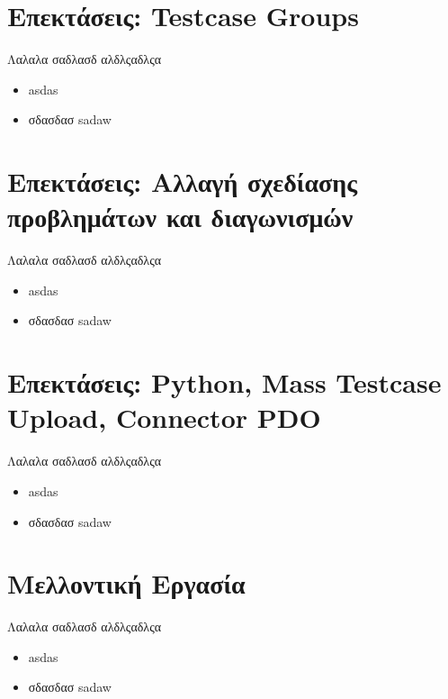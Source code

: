 \documentclass{beamer}
\begin{document}
\section{Επεκτάσεις: Testcase Groups}
\begin{frame}
  Λαλαλα σαδλασδ αλδλςαδλςα
  \begin{itemize}
      \item asdas
      \item σδασδασ sadaw
  \end{itemize}
\end{frame}

\section{Επεκτάσεις: Αλλαγή σχεδίασης προβλημάτων και διαγωνισμών}
\begin{frame}
  Λαλαλα σαδλασδ αλδλςαδλςα
  \begin{itemize}
      \item asdas
      \item σδασδασ sadaw
  \end{itemize}
\end{frame}

\section{Επεκτάσεις: Python, Mass Testcase Upload, Connector PDO}
\begin{frame}
  Λαλαλα σαδλασδ αλδλςαδλςα
  \begin{itemize}
      \item asdas
      \item σδασδασ sadaw
  \end{itemize}
\end{frame}


\section{Μελλοντική Εργασία}
\begin{frame}
  Λαλαλα σαδλασδ αλδλςαδλςα
  \begin{itemize}
      \item asdas
      \item σδασδασ sadaw
  \end{itemize}
\end{frame}
\end{document}
